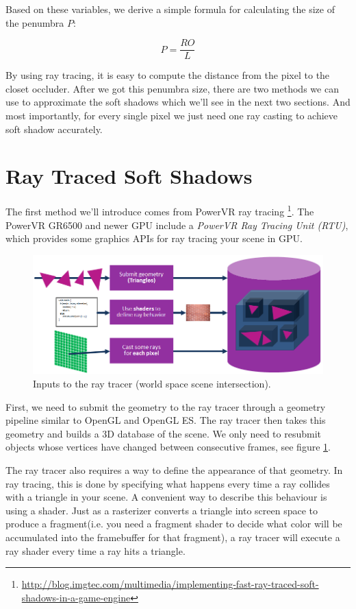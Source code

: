 Based on these variables, we derive a simple formula for calculating the size of the penumbra $P$:

\begin{equation}
	P=\frac{RO}{L}
\end{equation}

By using ray tracing, it is easy to compute the distance from the pixel to the closet occluder. After we got this penumbra size, there are two methods we can use to approximate the soft shadows which we'll see in the next two sections. And most importantly, for every single pixel we just need one ray casting to achieve soft shadow accurately.



\section{Ray Traced Soft Shadows}
The first method we'll introduce comes from PowerVR ray tracing \footnote{\url{http://blog.imgtec.com/multimedia/implementing-fast-ray-traced-soft-shadows-in-a-game-engine}}. The PowerVR GR6500 and newer GPU include a \textit{PowerVR Ray Tracing Unit (RTU)}, which provides some graphics APIs for ray tracing your scene in GPU.

\begin{figure}\label{f:PowerVR-GPU-Architecture}
	\includegraphics[width=1.0\textwidth]{graphics/shadows/Ray-tracing-in-games_Ray-tracing-inputs}
	\caption{Inputs to the ray tracer (world space scene intersection).}
\end{figure}

First, we need to submit the geometry to the ray tracer through a geometry pipeline similar to OpenGL and OpenGL ES. The ray tracer then takes this geometry and builds a 3D database of the scene. We only need to resubmit objects whose vertices have changed between consecutive frames, see figure \ref{f:PowerVR-GPU-Architecture}.

The ray tracer also requires a way to define the appearance of that geometry. In ray tracing, this is done by specifying what happens every time a ray collides with a triangle in your scene. A convenient way to describe this behaviour is using a shader. Just as a rasterizer converts a triangle into screen space to produce a fragment(i.e. you need a fragment shader to decide what color will be accumulated into the framebuffer for that fragment), a ray tracer will execute a ray shader every time a ray hits a triangle.

